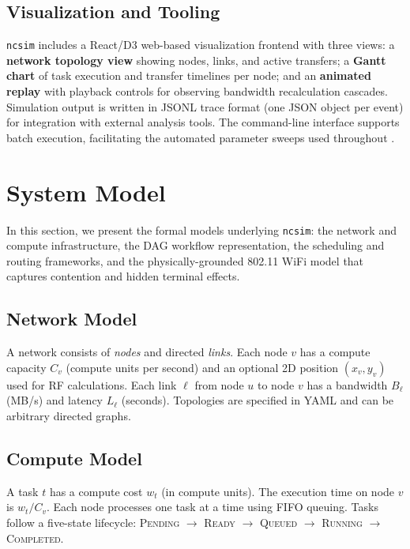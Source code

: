 \documentclass[conference]{IEEEtran}
\newcommand{\ncsim}{\texttt{ncsim}}
\begin{document}
\subsection{Visualization and Tooling}
\label{sec:viz}

\ncsim{} includes a React/D3 web-based visualization frontend with three
views: a \textbf{network topology view} showing nodes, links, and active
transfers; a \textbf{Gantt chart} of task execution and transfer timelines
per node; and an \textbf{animated replay} with playback controls for
observing bandwidth recalculation cascades.  Simulation output is written
in JSONL trace format (one JSON object per event) for integration with
external analysis tools.  The command-line interface supports batch
execution, facilitating the automated parameter sweeps used throughout
.


\section{System Model}
\label{sec:model}

In this section, we present the formal models underlying \ncsim{}: the
network and compute infrastructure, the DAG workflow representation,
the scheduling and routing frameworks, and the physically-grounded
802.11 WiFi model that captures contention and hidden terminal effects.

\subsection{Network Model}

A network consists of \emph{nodes} and directed \emph{links}.  Each node $v$
has a compute capacity $C_v$ (compute units per second) and an optional 2D
position $(x_v, y_v)$ used for RF calculations.  Each link $\ell$ from node
$u$ to node $v$ has a bandwidth $B_\ell$ (MB/s) and latency $L_\ell$
(seconds).  Topologies are specified in YAML and can be arbitrary directed
graphs.

\subsection{Compute Model}

A task $t$ has a compute cost $w_t$ (in compute units).  The execution time
on node $v$ is $w_t / C_v$.  Each node processes one task at a time using
FIFO queuing.  Tasks follow a five-state lifecycle: \textsc{Pending}
$\rightarrow$ \textsc{Ready} $\rightarrow$ \textsc{Queued} $\rightarrow$
\textsc{Running} $\rightarrow$ \textsc{Completed}.
\end{document}
